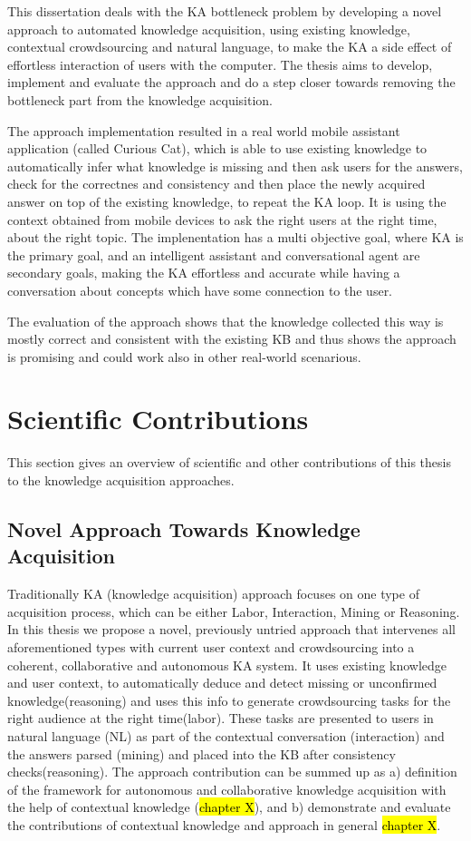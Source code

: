 This dissertation deals with the KA bottleneck problem by developing a novel
approach to automated knowledge acquisition, using existing knowledge,
contextual crowdsourcing and natural language, to make the KA a side effect of
effortless interaction of users with the computer. The thesis aims to develop,
implement and evaluate the approach and do a step closer towards removing the
bottleneck part from the knowledge acquisition.

The approach implementation resulted in a real world mobile assistant 
application (called Curious Cat), which is able to use existing knowledge to 
automatically infer 
what knowledge is missing and then ask users for the answers, check for
the correctnes and consistency and then place the newly acquired answer on
top of the existing knowledge, to repeat the KA loop. It is
using the context obtained from mobile devices to ask the right users at the 
right time, about the right topic. 
The implenentation has a multi objective goal, 
where KA is the primary goal, and an intelligent assistant and conversational 
agent are secondary goals, making the KA effortless and accurate while having a 
conversation about concepts which have some connection to the user.

The evaluation of the approach shows that the knowledge collected this way is
mostly correct and consistent with the existing KB and thus shows the approach
is promising and could work also in other real-world scenarious.

\section{Scientific Contributions}
This section gives an overview of scientific and other contributions of this thesis to the knowledge acquisition approaches.

\subsection{Novel Approach Towards Knowledge Acquisition}
Traditionally KA (knowledge acquisition) approach focuses on one type of acquisition process, which can be either Labor, Interaction, Mining or Reasoning\parencite{Zang2013}. In this thesis we propose a novel, previously untried approach that intervenes all aforementioned types with current user context and crowdsourcing into a coherent, collaborative and autonomous KA system. It uses existing knowledge and user context, to automatically deduce and detect  missing or unconfirmed knowledge(reasoning) and uses this info to generate crowdsourcing tasks for the right audience at the right time(labor). These tasks are presented to users in natural language (NL) as part of the contextual conversation (interaction) and the answers parsed (mining) and placed into the KB after consistency checks(reasoning). The approach contribution can be summed up as a) definition of the framework for autonomous and collaborative knowledge acquisition with the help of contextual knowledge (\hl{chapter X}), and b) demonstrate and evaluate the contributions of contextual knowledge and approach in general \hl{chapter X}.

